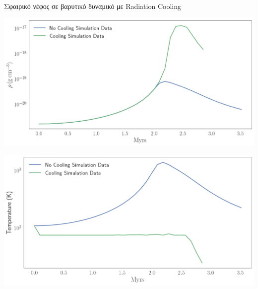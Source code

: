 \documentclass{beamer}
\begin{document}
\begin{frame}{Σφαιρικό νέφος σε βαρυτικό δυναμικό με Radiation Cooling}
	
\begin{center}
	\includegraphics[height=0.4\textheight]{../Document/DataImages/GRcenterTimeRHO}
\end{center}
\begin{center}
	\includegraphics[height=0.4\textheight]{../Document/DataImages/GRcenterTimeTemp}
\end{center}
\end{frame}	
\end{document}
